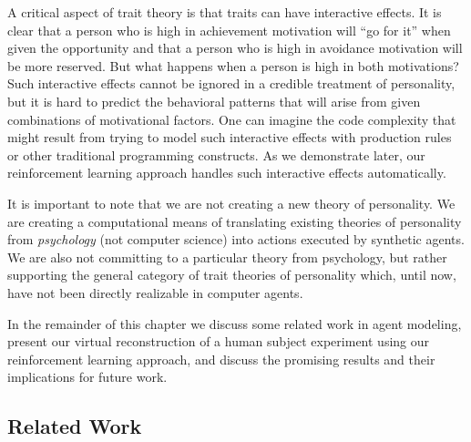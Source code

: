 A critical aspect of trait theory is that traits can have interactive effects.  It is clear that a person who is high in achievement motivation will ``go for it'' when given the opportunity and that a person who is high in avoidance motivation will be more reserved.  But what happens when a person is high in both motivations?  Such interactive effects cannot be ignored in a credible treatment of personality, but it is hard to predict the behavioral patterns that will arise from given combinations of motivational factors.  One can imagine the code complexity that might result from trying to model such interactive effects with production rules or other traditional programming constructs.  As we demonstrate later, our reinforcement learning approach handles such interactive effects automatically.

It is important to note that we are not creating a new theory of personality.  We are creating a computational means of translating existing theories of personality from {\em psychology} (not computer science) into actions executed by synthetic agents.  We are also not committing to a particular theory from psychology, but rather supporting the general category of trait theories of personality which, until now, have not been directly realizable in computer agents.

In the remainder of this chapter we discuss some related work in agent modeling, present our virtual reconstruction of a human subject experiment using our reinforcement learning approach, and discuss the promising results and their implications for future work.


\subsection{Related Work}\label{sec:related-work}

